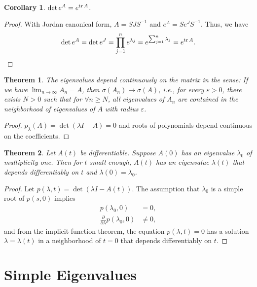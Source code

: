 \documentclass[10pt]{book}
\newtheorem{theorem}{Theorem}[chapter]
\newtheorem{corollary}{Corollary}[theorem]
\theoremstyle{definition}
\numberwithin{equation}{chapter}
\begin{document}
\medskip

\begin{corollary}\label{exponential_trace_corollary}
$\det e^A = e^{\tr A}$.
\end{corollary}
\begin{proof}
With Jordan canonical form, $A = SJS^{-1}$ and $e^A = Se^JS^{-1}$. Thus, we have
\begin{align*}
    \det e^A = \det e^J = \prod^n_{j=1} e^{\lambda_j} = e^{\sum^n_{j=1}\lambda_j} = e^{\tr A}.
\end{align*}
\end{proof}

\medskip

\begin{theorem}
The eigenvalues depend continuously on the matrix in the sense: If we have $\lim_{n\to\infty}A_n = A$, then $\sigma(A_n)\to \sigma(A)$, i.e., for every $\varepsilon > 0$, there exists $N > 0$ such that for $\forall n\geq N$, all eigenvalues of $A_n$ are contained in the neighborhood of eigenvalues of $A$ with radius $\varepsilon$.
\end{theorem}
\begin{proof}
$p_\lambda(A) = \det(\lambda I - A) = 0$ and roots of polynomials depend continuous on the coefficients.
\end{proof}

\medskip

\begin{theorem}
Let $A(t)$ be differentiable. Suppose $A(0)$ has an eigenvalue $\lambda_0$ of multiplicity one. Then for $t$ small enough, $A(t)$ has an eigenvalue $\lambda(t)$ that depends differentiably on $t$ and $\lambda(0) = \lambda_0$.
\end{theorem}
\begin{proof}
Let $p(\lambda, t) = \det (\lambda I - A(t))$. The assumption that $\lambda_0$ is a simple root of $p(s,0)$ implies 
\begin{align*}
    p(\lambda_0,0) & = 0, \\
    \frac{\partial}{\partial \lambda}p(\lambda_0,0) & \neq 0,
\end{align*}
and from the implicit function theorem, the equation $p(\lambda,t) = 0$ has a solution $\lambda = \lambda(t)$ in a neighborhood of $t=0$ that depends differentiably on $t$.
\end{proof}

\medskip

\section{Simple Eigenvalues}
\end{document}
